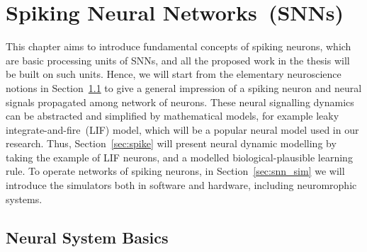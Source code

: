 \chapter{Spiking Neural Networks~(SNNs)}
\label{cha:bkg}
This chapter aims to introduce fundamental concepts of spiking neurons, which are basic processing units of SNNs, and all the proposed work in the thesis will be built on such units.
Hence, we will start from the elementary neuroscience notions in Section~\ref{sec:neuron_basic} to give a general impression of a spiking neuron and neural signals propagated among network of neurons.
These neural signalling dynamics can be abstracted and simplified by mathematical models, for example leaky integrate-and-fire~(LIF) model, which will be a popular neural model used in our research.
Thus, Section~\ref{sec:spike} will present neural dynamic modelling by taking the example of LIF neurons, and a modelled biological-plausible learning rule.
To operate networks of spiking neurons, in Section~\ref{sec:snn_sim} we will introduce the simulators both in software and hardware, including neuromrophic systems.


\section{Neural System Basics}
\label{sec:neuron_basic}

